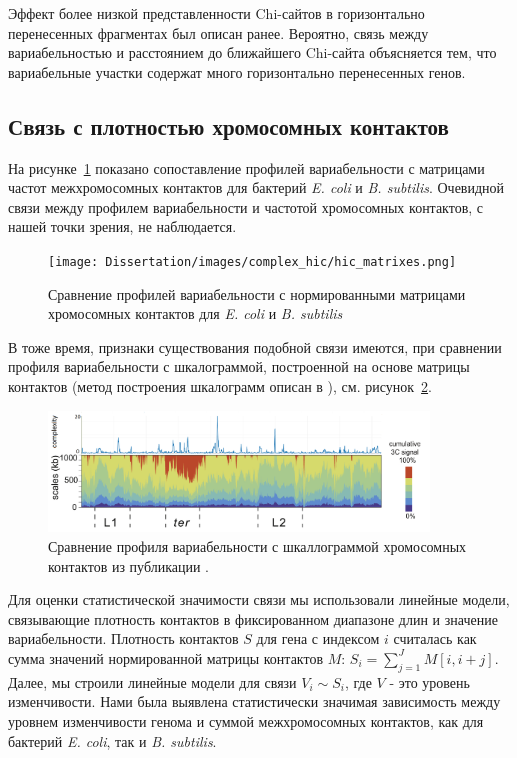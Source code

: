 Эффект более низкой представленности Chi-сайтов в горизонтально перенесенных фрагментах был описан ранее\cite{halpern2007identification}. Вероятно, связь между вариабельностью и расстоянием до ближайшего Chi-сайта объясняется тем, что вариабельные участки содержат много горизонтально перенесенных генов. 


\subsection{Связь с плотностью хромосомных контактов}


На рисунке~\ref{img:hic_matrixes} показано сопоставление профилей вариабельности с матрицами частот межхромосомных контактов для бактерий \textit{E. coli} и \textit{B. subtilis}. Очевидной связи между профилем вариабельности и частотой хромосомных контактов, с нашей точки зрения, не наблюдается.

\begin{figure}[!ht] 
  \center
    \texttt{[image: Dissertation/images/complex\_hic/hic\_matrixes.png]}
    \caption{Сравнение профилей вариабельности с нормированными матрицами хромосомных контактов для \textit{E. coli} и \textit{B. subtilis}}
    \label{img:hic_matrixes}
\end{figure}

В тоже время, признаки существования подобной связи имеются, при сравнении профиля вариабельности с шкалограммой, построенной на основе матрицы контактов (метод построения шкалограмм описан в \cite{lioy2018multiscale}), см. рисунок~\ref{img:scalogram_complexity_coli}.

\begin{figure}[!ht] 
  \center
    \includegraphics [width=0.9\textwidth] {Dissertation/images/complex_hic/hic_scalogram_complexity_coli.png}
    \caption{Сравнение профиля вариабельности с шкаллограммой хромосомных контактов из публикации \cite{lioy2018multiscale}.}
    \label{img:scalogram_complexity_coli}
\end{figure}

 Для оценки статистической значимости связи мы использовали линейные модели, связывающие плотность контактов в фиксированном диапазоне длин и значение вариабельности. Плотность контактов $S$ для гена с индексом $i$ считалась как сумма значений нормированной матрицы контактов $M$: $S_i = \sum_{j=1}^J M[i,i+j] $. Далее, мы строили линейные модели для связи $V_i \sim S_i$, где $V$ - это уровень изменчивости. Нами была выявлена статистически значимая зависимость между уровнем изменчивости генома и суммой межхромосомных контактов, как для бактерий \textit{E. coli}, так и \textit{B. subtilis}. 
 
